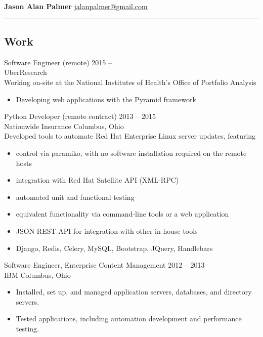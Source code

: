 \documentclass[12pt]{report}
\begin{document}
\textbf{\large Jason Alan Palmer} \hfill \href{mailto:jalanpalmer@gmail.com}{jalanpalmer@gmail.com}

\rule{\textwidth}{1pt}

\subsection*{Work}

Software Engineer (remote) \hfill 2015 -- ~~~~~~ \\
UberResearch \\
Working on-site at the National Institutes of Health's Office of Portfolio Analysis
\begin{itemize}
\item Developing web applications with the Pyramid framework
\\
\end{itemize}

Python Developer (remote contract) \hfill 2013 -- 2015 \\
Nationwide Insurance               \hfill Columbus, Ohio \\
Developed tools to automate Red Hat Enterprise Linux server updates, featuring
\begin{itemize}
\item control via paramiko, with no software installation required on the remote hosts
\item integration with Red Hat Satellite API (XML-RPC)
\item automated unit and functional testing
\item equivalent functionality via command-line tools or a web application
\item JSON REST API for integration with other in-house tools
\item Django, Redis, Celery, MySQL, Bootstrap, JQuery, Handlebars
\\
\end{itemize}

Software Engineer, Enterprise Content Management \hfill 2012 -- 2013 \\
IBM                                              \hfill Columbus, Ohio
\begin{itemize}
\item Installed, set up, and managed application servers, databases, and directory servers.
\item Tested applications, including automation development and performance testing.
\\
\end{itemize}
\end{document}
